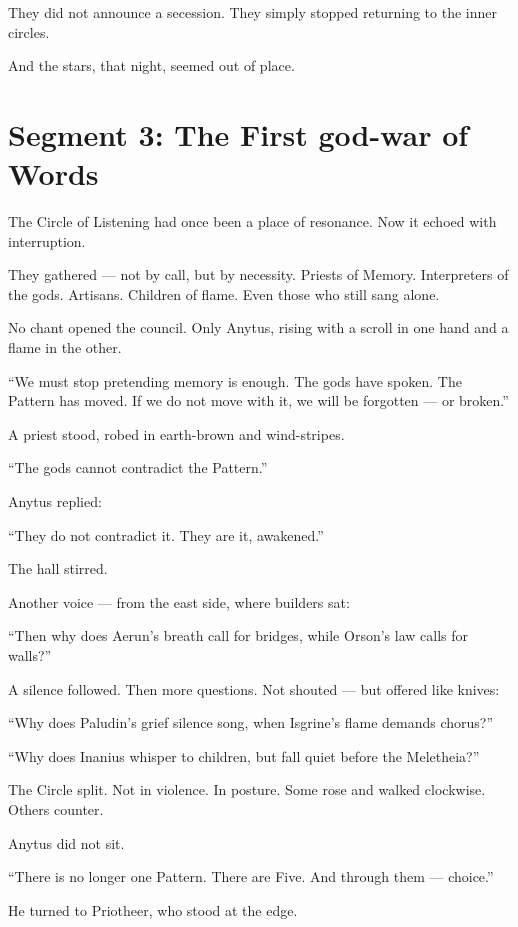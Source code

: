 \documentclass[10pt]{article}
\begin{document}
They did not announce a secession.  
They simply stopped returning to the inner circles.

And the stars, that night, seemed out of place.

\newpage

\section*{Segment 3: The First god-war of Words}

The Circle of Listening had once been a place of resonance.  
Now it echoed with interruption.

They gathered — not by call, but by necessity.  
Priests of Memory.  
Interpreters of the gods.  
Artisans. Children of flame.  
Even those who still sang alone.

No chant opened the council.  
Only Anytus, rising with a scroll in one hand and a flame in the other.

 “We must stop pretending memory is enough.  
 The gods have spoken.  
 The Pattern has moved.  
 If we do not move with it, we will be forgotten — or broken.”

A priest stood, robed in earth-brown and wind-stripes.

 “The gods cannot contradict the Pattern.”

Anytus replied:

 “They do not contradict it. They are it, awakened.”

The hall stirred.

Another voice — from the east side, where builders sat:

 “Then why does Aerun’s breath call for bridges,  
 while Orson’s law calls for walls?”

A silence followed.  
Then more questions.  
Not shouted — but offered like knives:

 “Why does Paludin’s grief silence song,  
 when Isgrine’s flame demands chorus?”

 “Why does Inanius whisper to children,  
 but fall quiet before the Meletheia?”

The Circle split.  
Not in violence.  
In posture.  
Some rose and walked clockwise.  
Others counter.

Anytus did not sit.

 “There is no longer one Pattern.  
 There are Five.  
 And through them — choice.”

He turned to Priotheer, who stood at the edge.
\end{document}

